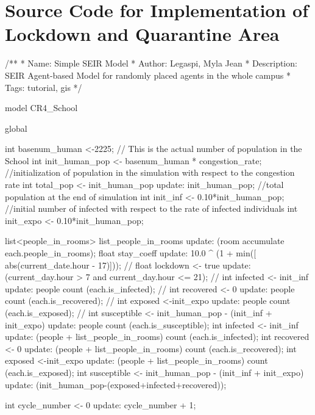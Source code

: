 \chapter{Source Code for Implementation of \\ Lockdown and
Quarantine Area}
\scriptsize
\begin{verbatimtab}[4]
    /**
    * Name: Simple SEIR Model
    * Author: Legaspi, Myla Jean
    * Description: SEIR Agent-based Model for randomly placed agents in the whole campus
    * Tags: tutorial, gis
    */
    
    model CR4_School
    
    global {
        int basenum_human <-2225;  // This is the actual number of population in the School
        int init_human_pop <- basenum_human * congestion_rate; //initialization of population
         in the simulation with respect to the congestion rate
        int total_pop <- init_human_pop update: init_human_pop; //total population at the end
         of simulation
        int init_inf <- 0.10*init_human_pop; //initial number of infected with respect to the
         rate of infected individuals
        int init_expo <- 0.10*init_human_pop;
        
        list<people_in_rooms> list_people_in_rooms update: (room accumulate each.people_in_rooms);
        float stay_coeff update: 10.0 ^ (1 + min([ abs(current_date.hour - 17)]));
    //	float lockdown <- true update: (current_day.hour > 7 and current_day.hour <= 21);
    //	int infected <- init_inf update: people count (each.is_infected);
    //	int recovered <- 0 update: people count (each.is_recovered);
    //	int exposed <-init_expo update: people count (each.is_exposed);
    //	int susceptible <- init_human_pop - (init_inf + init_expo) update: people count
     (each.is_susceptible);
        int infected <- init_inf update: (people + list_people_in_rooms) count (each.is_infected);
        int recovered <- 0 update: (people + list_people_in_rooms) count (each.is_recovered);
        int exposed <-init_expo update: (people + list_people_in_rooms) count (each.is_exposed);
        int susceptible <- init_human_pop - (init_inf + init_expo) update:
         (init_human_pop-(exposed+infected+recovered));
    
        int cycle_number <- 0 update: cycle_number + 1;
        
}
\end{verbatimtab}
